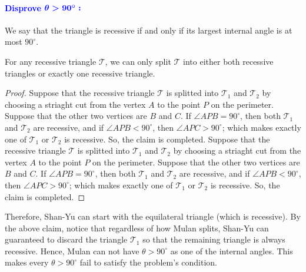 \documentclass[11pt]{article}
\begin{document}
\paragraph{\textcolor{blue}{Disprove} $\textcolor{blue}{\boldsymbol{\theta>90^{\circ}:}}$} We say that the triangle is recessive if and only if its largest internal angle is at most $90^{\circ}$.
\begin{claim}
    For any recessive triangle $\mathcal{T}$, we can only split $\mathcal{T}$ into either both recessive triangles or exactly one recessive triangle.
\end{claim}
\begin{proof}
    Suppose that the recessive triangle $\mathcal{T}$ is splitted into $\mathcal{T}_1$ and $\mathcal{T}_2$ by choosing a striaght cut from the vertex $A$ to the point $P$ on the perimeter. Suppose that the other two vertices are $B$ and $C$. If $\angle{APB}=90^{\circ}$, then both $\mathcal{T}_1$ and $\mathcal{T}_2$ are recessive, and if $\angle{APB}<90^{\circ}$, then $\angle{APC}>90^{\circ}$; which makes exactly one of $\mathcal{T}_1$ or $\mathcal{T}_2$ is recessive. So, the claim is completed. Suppose that the recessive triangle $\mathcal{T}$ is splitted into $\mathcal{T}_1$ and $\mathcal{T}_2$ by choosing a striaght cut from the vertex $A$ to the point $P$ on the perimeter. Suppose that the other two vertices are $B$ and $C$. If $\angle{APB}=90^{\circ}$, then both $\mathcal{T}_1$ and $\mathcal{T}_2$ are recessive, and if $\angle{APB}<90^{\circ}$, then $\angle{APC}>90^{\circ}$; which makes exactly one of $\mathcal{T}_1$ or $\mathcal{T}_2$ is recessive. So, the claim is completed.
\end{proof}

Therefore, Shan-Yu can start with the equilateral triangle (which is recessive). By the above claim, notice that regardless of how Mulan splits, Shan-Yu can guaranteed to discard the triangle $\mathcal{T}_1$ so that the remaining triangle is always recessive. Hence, Mulan can not have $\theta>90^{\circ}$ as one of the internal angles. This makes every $\theta>90^{\circ}$ fail to satisfy the problem's condition.
\end{document}
